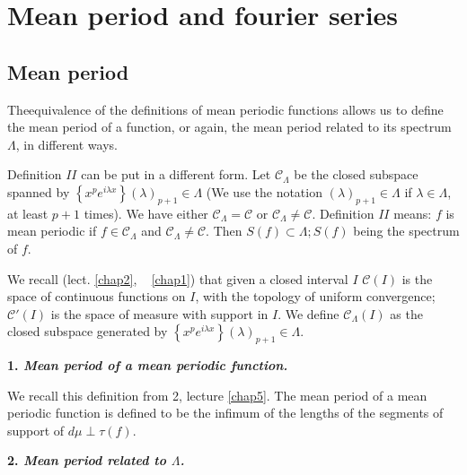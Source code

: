 
\chapter{Mean period and fourier series}\label{chap6}%

\section{Mean period}\label{chap6:sec1}

The\pageoriginale equivalence of the definitions of mean periodic functions allows us
to define the mean period of a function, or again, the mean period
related to its spectrum $\Lambda$, in different ways. 

Definition $II$ can be put in a different form. Let
$\mathscr{C}_{\Lambda}$ be the closed subspace spanned by $\left\{x^p
e^{i \lambda x}\right\}(\lambda)_{p+1}\in \Lambda$ (We use the
notation $(\lambda)_{p+1}\in \Lambda$ if $\lambda \in \Lambda$, at
least $p+1$ times). We have either $\mathscr{C}_{\Lambda} =
\mathscr{C}$ or $\mathscr{C}_{\Lambda}\neq \mathscr{C}$. Definition
$II$ means: $f$ is mean periodic if $f \in \mathscr{C}_{\Lambda}$ and
$\mathscr{C}_{\Lambda} \neq \mathscr{C}$. Then $S (f) \subset \Lambda;
S(f)$ being the spectrum of $f$. 

We recall (lect. \ref{chap2}, ~ \ref{chap1}) that given a closed interval $I$
$\mathscr{C}(I)$ is the space of continuous functions on $I$, with the
topology of uniform convergence; $\mathscr{C}'(I)$ is the space of
measure with support in $I$. We define $\mathscr{C}_{\Lambda}(I)$ as
the closed subspace generated by $\left \{ x^p e^{i \lambda x}\right
\} (\lambda)_{p+1}\in \Lambda$. 

\medskip
{}

\textbf{1. \textit{Mean period of a mean periodic function.}}

We recall this definition from 2, lecture \ref{chap5}. The mean period of a
mean periodic function is defined to be the infimum of the lengths of
the segments of support of $d \mu \perp \tau (f)$. 

\medskip
\textbf{2. \textit{Mean period related to $\Lambda$.}}

